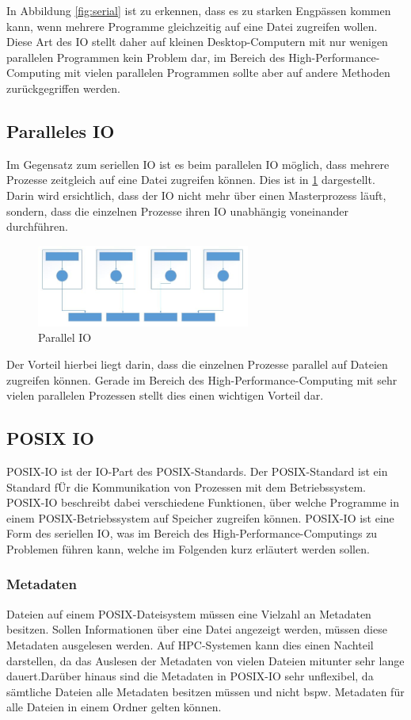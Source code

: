 In Abbildung \ref{fig:serial} ist zu erkennen, dass es zu starken Engp\"assen kommen kann, wenn mehrere Programme gleichzeitig auf eine Datei zugreifen wollen. Diese Art des IO stellt daher auf kleinen Desktop-Computern mit nur wenigen parallelen Programmen kein Problem dar, im Bereich des High-Performance-Computing mit vielen parallelen Programmen sollte aber auf andere Methoden zur\"uckgegriffen werden.\cite{Cazes.26.09.2013}

\subsection{Paralleles IO}
Im Gegensatz zum seriellen IO ist es beim parallelen IO m\"oglich, dass mehrere Prozesse zeitgleich auf eine Datei zugreifen k\"onnen. Dies ist in \ref{fig:parallel} dargestellt. Darin wird ersichtlich, dass der IO nicht mehr \"uber einen Masterprozess l\"auft, sondern, dass die einzelnen Prozesse ihren IO unabh\"angig voneinander durchf\"uhren.
\begin{figure}[h]
	\centering
	\includegraphics[width=7cm]{fig/ParallelIO.jpg}
	\caption{Parallel IO \cite{Cazes.26.09.2013}}
	\label{fig:parallel}
\end{figure}
Der Vorteil hierbei liegt darin, dass die einzelnen Prozesse parallel auf Dateien zugreifen k\"onnen. Gerade im Bereich des High-Performance-Computing mit sehr vielen parallelen Prozessen stellt dies einen wichtigen Vorteil dar.\cite{Cazes.26.09.2013}
\subsection{POSIX IO}
POSIX-IO ist der IO-Part des POSIX-Standards. Der POSIX-Standard ist ein Standard f\"Ur die Kommunikation von Prozessen mit dem Betriebssystem. POSIX-IO beschreibt dabei verschiedene Funktionen, \"uber welche Programme in einem POSIX-Betriebssystem auf Speicher zugreifen k\"onnen. POSIX-IO ist eine Form des seriellen IO, was im Bereich des High-Performance-Computings zu Problemen f\"uhren kann, welche im Folgenden kurz erl\"autert werden sollen.
\subsubsection{Metadaten}
Dateien auf einem POSIX-Dateisystem m\"ussen eine Vielzahl an Metadaten besitzen. Sollen Informationen \"uber eine Datei angezeigt werden, m\"ussen diese Metadaten ausgelesen werden. Auf HPC-Systemen kann dies einen Nachteil darstellen, da das Auslesen der Metadaten von vielen Dateien mitunter sehr lange dauert\cite{Layton.02.03.2010}.Dar\"uber hinaus sind die Metadaten in POSIX-IO sehr unflexibel, da s\"amtliche Dateien alle Metadaten besitzen m\"ussen und nicht bspw. Metadaten f\"ur alle Dateien in einem Ordner gelten k\"onnen.
